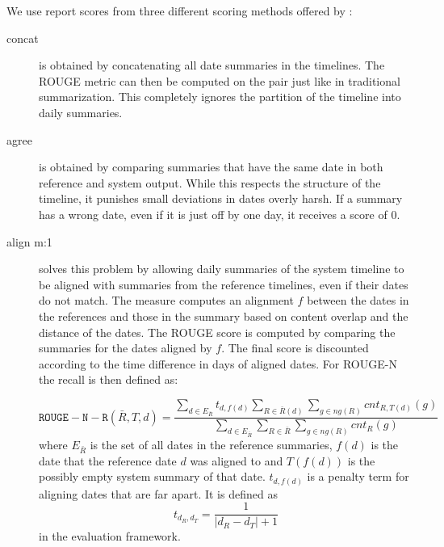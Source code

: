 \documentclass[a4paper,BCOR=10mm]{report}
\numberwithin{lemma}{chapter}
\numberwithin{definition}{chapter}
\begin{document}
We use report scores from three different scoring methods offered by \citet{tilse}:
\begin{description}
\item[concat] {is obtained by concatenating all date summaries in the timelines. The ROUGE metric can then be computed on the pair just like in traditional summarization.
This completely ignores the partition of the timeline into daily summaries.}
\item[agree] {is obtained by comparing summaries that have the same date in both reference and system output. While this respects the structure of the timeline, it punishes small deviations in dates overly harsh. If a summary has a wrong date, even if it is just off by one day, it receives a score of $0$.}
\item[align m:1] {solves this problem by allowing daily summaries of the system timeline to be aligned with summaries from the reference timelines, even if their dates do not match. The measure computes an alignment $f$ between the dates in the references and those in the summary based on content overlap and the distance of the dates. The ROUGE score is computed by comparing the summaries for the dates aligned by $f$.
The final score is discounted according to the time difference in days of aligned dates. For ROUGE-N the recall is then defined as:

\begin{equation}
    \mathtt{ROUGE-N-R}(\bar{R}, T, d) =  \frac{
        \sum_{d \in E_{\bar{R}}} t_{d, f(d)}
        \sum_{R \in \bar{R}(d)}
        \sum_{g \in \mathit{ng}(R)}
        \mathit{cnt}_{R,T(d)}(g)
    }{
        \sum_{d \in E_{\bar{R}}}
        \sum_{R \in \bar{R}}
        \sum_{g \in \mathit{ng}(R)}
        \mathit{cnt}_R(g)
    }
\end{equation}
where $E_{\bar{R}}$ is the set of all dates in the reference summaries,
$f(d)$ is the date that the reference date $d$ was aligned to and $T(f(d))$ is the possibly empty system summary of that date.
$t_{d,f(d)}$ is a penalty term for aligning dates that are far apart.
It is defined as
\begin{equation}
t_{d_R, d_T} = \frac{1}{|d_R - d_T| + 1}
\end{equation}
in the evaluation framework.


 }
\end{description}
\end{document}
